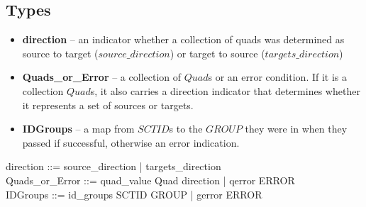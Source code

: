 \documentclass{article}
\begin{document}
\subsection{Types}

\begin{itemize}[noitemsep,nolistsep]
\item \textbf{direction} -- an indicator whether a collection of quads was determined as source to target ($source\_direction$) or target to source ($targets\_direction$)
\item \textbf{Quads\_or\_Error} --  a collection of $Quad$s or an error condition. If it is a collection $Quad$s, it also carries
a direction indicator that determines whether it represents a set of sources or targets. 
\item \textbf{IDGroups} -- a map from $SCTID$s to the $GROUP$ they were in when they passed if successful, otherwise an error indication.
\end{itemize}

\begin{zed}
direction ::= source\_direction | targets\_direction \\
Quads\_or\_Error ::= quad\_value \ldata \power Quad \cross direction \rdata | qerror \ldata ERROR \rdata \\
\also
IDGroups ::= id\_groups \ldata SCTID \pfun \power GROUP \rdata | gerror \ldata ERROR \rdata
\end{zed}
\end{document}
